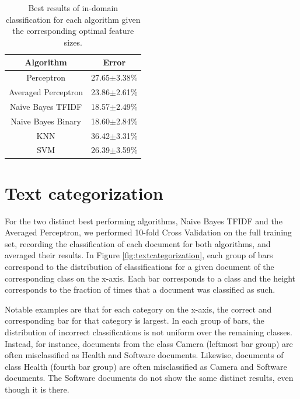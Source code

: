 \begin{table}[h!]
	\centering
	\begin{tabular}{ | c | c | } \hline
	\textbf{Algorithm} & \textbf{Error} \\ \hline
	Perceptron & 27.65$\pm$3.38\% \\ \hline
	Averaged Perceptron & 23.86$\pm$2.61\% \\ \hline
	Naive Bayes TFIDF & 18.57$\pm$2.49\% \\ \hline
	Naive Bayes Binary & 18.60$\pm$2.84\% \\ \hline
	KNN & 36.42$\pm$3.31\% \\ \hline
	SVM & 26.39$\pm$3.59\% \\ \hline
	\end{tabular}
	\caption{Best results of in-domain classification for each algorithm given the corresponding optimal feature sizes.}
	\label{tab:algorithm_best_performance}
\end{table}
\section{Text categorization}

For the two distinct best performing algorithms, Naive Bayes TFIDF and the Averaged Perceptron, we performed 10-fold Cross Validation on the full training set, recording the classification of each document for both algorithms, and averaged their results. In Figure \ref{fig:textcategorization}, each group of bars correspond to the distribution of classifications for a given document of the corresponding class on the x-axis. Each bar corresponds to a class and the height corresponds to the fraction of times that a document was classified as such.

Notable examples are that for each category on the x-axis, the correct and corresponding bar for that category is largest. In each group of bars, the distribution of incorrect classifications is not uniform over the remaining classes. Instead, for instance, documents from the class Camera (leftmost bar group) are often misclassified as Health and Software documents. Likewise, documents of class Health (fourth bar group) are often misclassified as Camera and Software documents. The Software documents do not show the same distinct results, even though it is there.

